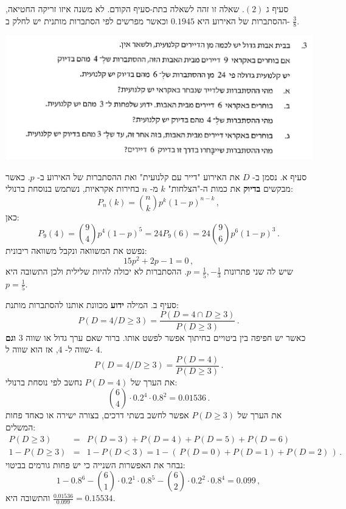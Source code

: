 \documentclass[12pt,a4paper]{article}
\begin{document}
סעיף ג 
$(2)$.
שאלה זו זהה לשאלה בתת-סעיף הקודם. לא משנה איזו זריקה החטיאה, ההסתברות של האירוע היא 
$0.1945$
וכאשר מפרשים לפי הסתברות מותנית יש לחלק ב-%
$\frac{3}{8}$.


\textbf{}

\begin{center}
\includegraphics[width=.95\textwidth]{summer-2017a-3}
\end{center}

סעיף א. נסמן ב-%
$D$
את האירוע "דייר עם קלנועית" ואת ההסתברות של האירוע ב-%
$p$.
כאשר מבקשים
\textbf{בדיוק}
את כמות ה-"הצלחות" 
$k$
מ-%
$n$
בחירות אקראיות, נשתמש בנוסחת ברנולי:
\[
P_n(k)={n\choose k} p^k (1-p)^{n-k}\,,
\]
כאן:
\[
P_9(4)={9\choose 4} p^4 (1-p)^5=24P_9(6)=24 {9\choose 6} p^6 (1-p)^3\,.
\]
נפשט את המשוואה ונקבל משוואה ריבונית:
\[
15p^2+2p-1=0\,,
\]
שיש לה שני פתרונות
$p=\frac{1}{5},-\frac{1}{3}$.
ההסתברות לא יכולה להיות שלילית ולכן התשובה היא 
$p=\frac{1}{5}$.

סעיף ב. המילה
\textbf{ידוע}
מכוונת אותנו להסתברות מותנת:
\[
P(D=4/D\ge3) = \frac{P(D=4\cap D\ge 3)}{P(D\ge 3)}\,.
\]
כאשר יש חפיפה בין ביטויים בחיתוך אפשר לפשט אותו. ברור שאם ערך גדול או שווה
$3$
\textbf{וגם}
שווה ל-%
$4$,
אז הוא שווה ל-%
$4$.
\[
P(D=4/D\ge3) =\frac{P(D=4)}{P(D\ge 3)}\,.
\]
את הערך של
$P(D=4)$
נחשב לפי נוסחת ברנולי:
\[
{6\choose 4}\cdot 0.2^4 \cdot 0.8^2= 0.01536\,.
\]
את הערך של
$P(D\ge 3)$
אפשר לחשב בשתי דרכים, בצורה ישירה או כאחד פחות המשלים:
\begin{eqnarray*}
P(D\ge 3) &=& P(D=3) + P(D=4) + P(D=5) + P(D=6)\\
1-P(D\ge 3) &=& 1- P(D<3)=1-(\,P(D=0) + P(D=1) + P(D=2)\,)\,.
\end{eqnarray*}
נבחר את האפשרות השנייה כי יש פחות גורמים בביטוי:
\[
1-0.8^6-{6\choose 1}\cdot 0.2^1\cdot 0.8^5 - {6 \choose 2}\cdot 0.2^2\cdot 0.8^4=0.099\,,
\]
והתשובה היא
$\displaystyle\frac{0.01536}{0.099}=0.15534$.
\end{document}
